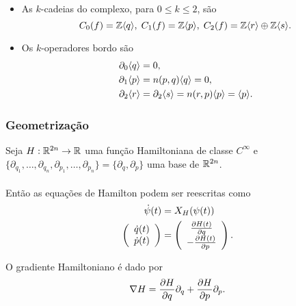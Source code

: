 \documentclass{beamer}
\begin{document}
	\begin{frame}
		\begin{itemize}
		\item As $k$-cadeias do complexo, para $0\leq k\leq 2$, são
		$$
		C_{0}(f) = \mathbb{Z}\langle q\rangle,\; C_{1}(f) = \mathbb{Z}\langle p\rangle,\; C_{2}(f) = \mathbb{Z}\langle r\rangle\oplus\mathbb{Z}\langle s\rangle.
		$$
		
		\item Os $k$-operadores bordo são
		$$
			\begin{aligned}
			\partial_{0}\langle q\rangle &=0, 
			\\
			\partial_{1}\langle p\rangle &=n(p,q)\langle q\rangle = 0,
			\\
			\partial_{2}\langle r\rangle&=\partial_{2}\langle s\rangle = n(r,p)\langle p\rangle = \langle p\rangle.
			\end{aligned}
		$$
		
		\end{itemize}
	\end{frame}
	\begin{frame}
			\frametitle{Geometrização}
			
			Seja $H:\mathbb{R}^{2n} \to \mathbb{R}^{}$ uma função Hamiltoniana de classe $C^{\infty}$ e $\{\partial_{q_{1}}, \dots, \partial_{q_{n}}, \partial_{p_{1}}, \dots, \partial_{p_{n}}\}=\{\partial_{q}, \partial_{p}\}$ uma base de $\mathbb{R}^{2n}$. 
			\\~\\
		Então as equações de Hamilton podem ser reescritas como 
		$$
		\begin{aligned}
		\dot{\psi}(t) &= X_{H}(\psi(t))
		\\
		\left(
		\begin{array}{c}
		\dot{q}(t)
		\\
		\dot{p}(t)
		\end{array}
		\right)
		&=
		\left(
		\begin{array}{c}
		\frac{\partial H(t)}{\partial q}
		\\
		-\frac{\partial H(t)}{\partial p}
		\end{array}
		\right).
		\end{aligned}
		$$
		
		O gradiente Hamiltoniano é dado por
		$$
		\nabla H =\frac{\partial H}{\partial q}\partial_{q} + \frac{\partial H}{\partial p}\partial_{p}.
		$$
	\end{frame}
	
\end{document}
